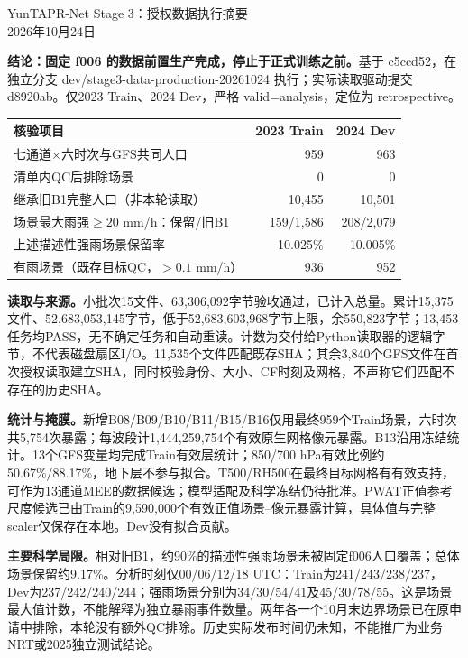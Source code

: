 \documentclass[UTF8,10pt]{ctexart}
\begin{document}
\begin{center}{\Large YunTAPR-Net Stage 3：授权数据执行摘要}\\[3pt]2026年10月24日\end{center}
\textbf{结论：固定 f006 的数据前置生产完成，停止于正式训练之前。}基于 c5ccd52，在独立分支 dev/stage3-data-production-20261024 执行；实际读取驱动提交 d8920ab。仅2023 Train、2024 Dev，严格 valid=analysis，定位为 retrospective。

\begin{tabularx}{\textwidth}{Xrr}
\toprule 核验项目 & 2023 Train & 2024 Dev\\\midrule
七通道$\times$六时次与GFS共同人口 & 959 & 963\\
清单内QC后排除场景 & 0 & 0\\
继承旧B1完整人口（非本轮读取） & 10,455 & 10,501\\
场景最大雨强$\ge20$ mm/h：保留/旧B1 & 159/1,586 & 208/2,079\\
上述描述性强雨场景保留率 & 10.025\% & 10.005\%\\
有雨场景（既存目标QC，$>0.1$ mm/h） & 936 & 952\\\bottomrule
\end{tabularx}

\textbf{读取与来源。}小批次15文件、63,306,092字节验收通过，已计入总量。累计15,375文件、52,683,053,145字节，低于52,683,603,968字节上限，余550,823字节；13,453任务均PASS，无不确定任务和自动重读。计数为交付给Python读取器的逻辑字节，不代表磁盘扇区I/O。11,535个文件匹配既存SHA；其余3,840个GFS文件在首次授权读取建立SHA，同时校验身份、大小、CF时刻及网格，不声称它们匹配不存在的历史SHA。

\textbf{统计与掩膜。}新增B08/B09/B10/B11/B15/B16仅用最终959个Train场景，六时次共5,754次暴露；每波段计1,444,259,754个有效原生网格像元暴露。B13沿用冻结统计。13个GFS变量均完成Train有效层统计；850/700 hPa有效比例约50.67\%/88.17\%，地下层不参与拟合。T500/RH500在最终目标网格有有效支持，可作为13通道MEE的数据候选；模型适配及科学冻结仍待批准。PWAT正值参考尺度候选已由Train的9,590,000个有效正值场景--像元暴露计算，具体值与完整scaler仅保存在本地。Dev没有拟合贡献。

\textbf{主要科学局限。}相对旧B1，约90\%的描述性强雨场景未被固定f006人口覆盖；总体场景保留约9.17\%。分析时刻仅00/06/12/18 UTC：Train为241/243/238/237，Dev为237/242/240/244；强雨场景分别为34/30/54/41及45/30/78/55。这是场景最大值计数，不能解释为独立暴雨事件数量。两年各一个10月末边界场景已在原申请中排除，本轮没有额外QC排除。历史实际发布时间仍未知，不能推广为业务NRT或2025独立测试结论。
\end{document}
